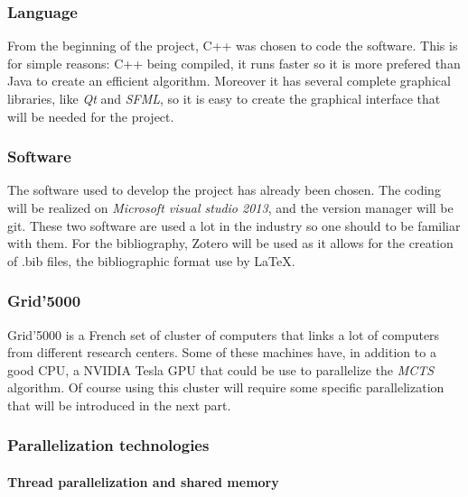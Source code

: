 \label{last part}
\subsubsection{Language}

From the beginning of the project, C++ was chosen to code the software. This is for simple reasons: C++ being compiled, it runs faster so it is more prefered than Java to create an efficient algorithm.  Moreover it has several complete graphical libraries, like \emph{Qt} and \emph{SFML}, so it is easy to create the graphical interface that will be needed for the project.

\subsubsection{Software}

The software used to develop the project has already been chosen. The coding will be realized on \emph{Microsoft visual studio 2013}, and the version manager will be git. These two software are used a lot in the industry so one should to be familiar with them.
For the bibliography, Zotero will be used as it allows for the creation of .bib files, the bibliographic format use by LaTeX.

\subsubsection{Grid'5000}

Grid'5000 is a French set of cluster of computers that links a lot of computers from different research centers. Some of these machines have, in addition to a good CPU, a NVIDIA Tesla GPU that could be use to parallelize the \emph{MCTS} algorithm. Of course using this cluster will require some specific parallelization that will be introduced in the next part.

\subsubsection{Parallelization technologies}

\paragraph{Thread parallelization and shared memory}\mbox{}\\\mbox{}\\

